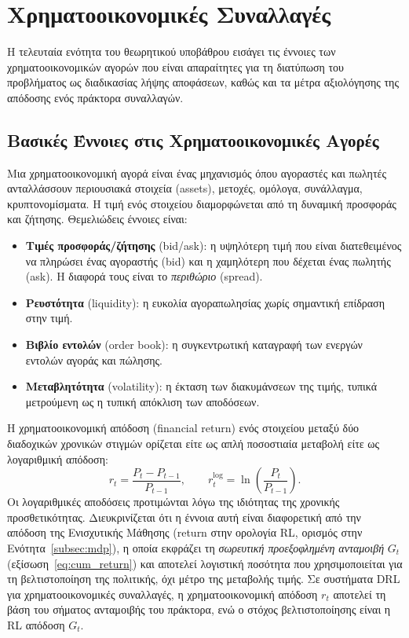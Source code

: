 \section{Χρηματοοικονομικές Συναλλαγές}
\label{sec:finance}

Η τελευταία ενότητα του θεωρητικού υποβάθρου εισάγει τις έννοιες των
χρηματοοικονομικών αγορών που είναι απαραίτητες για τη διατύπωση του
προβλήματος ως διαδικασίας λήψης αποφάσεων, καθώς και τα μέτρα αξιολόγησης της
απόδοσης ενός πράκτορα συναλλαγών.


\subsection{Βασικές Έννοιες στις Χρηματοοικονομικές Αγορές}
\label{subsec:market-basics}

Μια χρηματοοικονομική αγορά είναι ένας μηχανισμός όπου αγοραστές και
πωλητές ανταλλάσσουν περιουσιακά στοιχεία
(assets), μετοχές, ομόλογα, συνάλλαγμα,
κρυπτονομίσματα. Η τιμή ενός στοιχείου διαμορφώνεται από τη
δυναμική προσφοράς και ζήτησης. Θεμελιώδεις έννοιες είναι:
\begin{itemize}
    \item \textbf{Τιμές προσφοράς/ζήτησης}
    (bid/ask): η υψηλότερη τιμή που είναι
    διατεθειμένος να πληρώσει ένας αγοραστής (bid)
    και η χαμηλότερη που δέχεται ένας πωλητής
    (ask). Η διαφορά τους είναι το
    \emph{περιθώριο} (spread).
    \item \textbf{Ρευστότητα} (liquidity): η
    ευκολία αγοραπωλησίας χωρίς σημαντική επίδραση στην τιμή.
    \item \textbf{Βιβλίο εντολών} (order book): η
    συγκεντρωτική καταγραφή των ενεργών εντολών αγοράς και πώλησης.
    \item \textbf{Μεταβλητότητα} (volatility): η
    έκταση των διακυμάνσεων της τιμής, τυπικά μετρούμενη ως η τυπική απόκλιση
    των αποδόσεων.
\end{itemize}

Η χρηματοοικονομική απόδοση (financial return) ενός στοιχείου μεταξύ
δύο διαδοχικών χρονικών στιγμών ορίζεται είτε ως απλή ποσοστιαία μεταβολή είτε
ως λογαριθμική απόδοση:
\begin{equation}
    r_t = \frac{P_t - P_{t-1}}{P_{t-1}},
    \qquad
    r_t^{\log} = \ln\!\left(\frac{P_t}{P_{t-1}}\right).
    \label{eq:returns}
\end{equation}
Οι λογαριθμικές αποδόσεις προτιμώνται λόγω της ιδιότητας της χρονικής
προσθετικότητας. Διευκρινίζεται ότι η έννοια αυτή είναι διαφορετική από την
απόδοση της Ενισχυτικής Μάθησης (return στην ορολογία RL, ορισμός
στην Ενότητα~\ref{subsec:mdp}), η οποία εκφράζει τη \emph{σωρευτική
προεξοφλημένη ανταμοιβή} $G_t$ (εξίσωση~\ref{eq:cum_return}) και
αποτελεί λογιστική ποσότητα που χρησιμοποιείται για τη βελτιστοποίηση της
πολιτικής, όχι μέτρο της μεταβολής τιμής. Σε συστήματα DRL για χρηματοοικονομικές συναλλαγές, η χρηματοοικονομική
απόδοση $r_t$ αποτελεί τη βάση του σήματος ανταμοιβής του πράκτορα, ενώ ο
στόχος βελτιστοποίησης είναι η RL απόδοση $G_t$.

